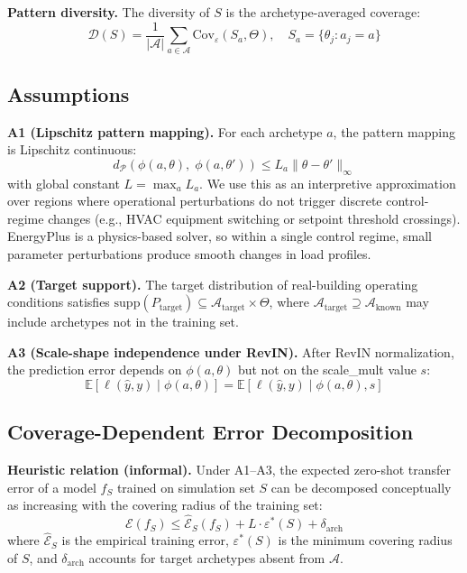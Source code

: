 \documentclass[preprint,12pt,authoryear]{elsarticle}
\begin{document}
\textbf{Pattern diversity.} The diversity of $S$ is the archetype-averaged coverage:
\begin{equation}
\mathcal{D}(S) = \frac{1}{|\mathcal{A}|}\sum_{a \in \mathcal{A}} \mathrm{Cov}_\varepsilon(S_a, \Theta), \quad S_a = \{\theta_j : a_j = a\}
\end{equation}

\subsection{Assumptions}

\textbf{A1 (Lipschitz pattern mapping).} For each archetype $a$, the pattern mapping is Lipschitz continuous:
\begin{equation}
d_{\mathcal{P}}(\phi(a, \theta),\; \phi(a, \theta')) \leq L_a \|\theta - \theta'\|_\infty
\end{equation}
with global constant $L = \max_a L_a$. We use this as an interpretive approximation over regions where operational perturbations do not trigger discrete control-regime changes (e.g., HVAC equipment switching or setpoint threshold crossings). EnergyPlus is a physics-based solver, so within a single control regime, small parameter perturbations produce smooth changes in load profiles.

\textbf{A2 (Target support).} The target distribution of real-building operating conditions satisfies $\mathrm{supp}(P_{\text{target}}) \subseteq \mathcal{A}_{\text{target}} \times \Theta$, where $\mathcal{A}_{\text{target}} \supseteq \mathcal{A}_{\text{known}}$ may include archetypes not in the training set.

\textbf{A3 (Scale-shape independence under RevIN).} After RevIN normalization, the prediction error depends on $\phi(a, \theta)$ but not on the scale\_mult value $s$:
\begin{equation}
\mathbb{E}[\ell(\hat{y}, y) \mid \phi(a,\theta)] = \mathbb{E}[\ell(\hat{y}, y) \mid \phi(a,\theta), s]
\end{equation}

\subsection{Coverage-Dependent Error Decomposition}

\textbf{Heuristic relation (informal).} Under A1--A3, the expected zero-shot transfer error of a model $f_S$ trained on simulation set $S$ can be decomposed conceptually as increasing with the covering radius of the training set:
\begin{equation}
\mathcal{E}(f_S) \leq \hat{\mathcal{E}}_S(f_S) + L \cdot \varepsilon^*(S) + \delta_{\mathrm{arch}}
\label{eq:bound}
\end{equation}
where $\hat{\mathcal{E}}_S$ is the empirical training error, $\varepsilon^*(S)$ is the minimum covering radius of $S$, and $\delta_{\mathrm{arch}}$ accounts for target archetypes absent from $\mathcal{A}$.
\end{document}
